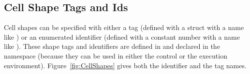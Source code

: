 \subsection{Cell Shape Tags and Ids}
\label{sec:CellShapeTagsIds}


Cell shapes can be specified with either a tag (defined with a struct with
a name like ) or an enumerated identifier
(defined with a constant number with a name like
). These shape tags and identifiers are
defined in  and declared in the \vtkm{}
namespace (because they can be used in either the control or the execution
environment). Figure~\ref{fig:CellShapes} gives both the identifier and the
tag names.

